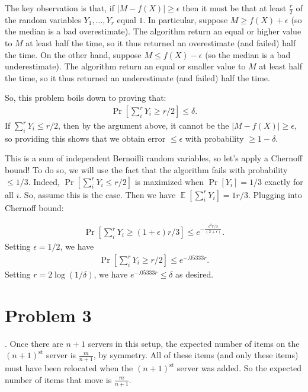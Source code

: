 \documentclass[11pt]{article}
\DeclareMathOperator*{\E}{\mathbb{E}}
\begin{document}
The key observation is that, if $|M - f(X)| \geq \epsilon$ then it must be that at least $\frac{r}{2}$ of the random variables $Y_1, \ldots, Y_r$ equal $1$. In particular, suppose $M \geq f(X) + \epsilon$ (so the median is a bad overestimate). The algorithm return an equal or higher value to $M$ at least  half the time, so it thus returned an overestimate (and failed) half the time. On the other hand, suppose  $M \leq f(X) - \epsilon$ (so the median is a bad underestimate). The algorithm return an equal or smaller value to $M$ at least half the time, so it thus returned an underestimate (and failed) half the time. 

So, this problem boils down to proving that: 
\begin{align*}
\Pr\left[\sum_i^r Y_i \geq r/2\right] \leq \delta.
\end{align*}
If $\sum_i^r Y_i \leq r/2$, then by the argument above, it cannot be the $|M - f(X)| \geq \epsilon$, so providing this shows that we obtain error $\leq \epsilon$ with probability $\geq 1-\delta$. 

This is a sum of independent Bernoilli random variables, so let's apply a Chernoff bound! To do so, we will use the fact that the algorithm fails with probability $\leq 1/3$. Indeed, $\Pr\left[\sum_i^r Y_i \leq r/2\right]$ is maximized when $\Pr[Y_i] = 1/3$ exactly for all $i$. So, assume this is the case. Then we have $\E[\sum_i^r Y_i] = 1r/3$. Plugging into Chernoff bound:

\begin{align*}
\Pr\left[\sum_i^r Y_i \geq (1+\epsilon) r/3\right] \leq e^{-\frac{\epsilon^2 r/3}{(2+\epsilon)}}.
\end{align*}
Setting $\epsilon = 1/2$, we have
\begin{align*}
	\Pr\left[\sum_i^r Y_i \geq r/2\right] \leq e^{-.05333 r}. 
\end{align*}
Setting $r = 2\log(1/\delta)$, we have $e^{-.05333 r} \leq \delta$ as desired.


\section*{Problem 3}
	\smallskip{}.\hspace{1em} 
	Once there are $n+1$ servers in this setup, the expected number of items on the $(n+1)^\text{st}$ server is $\frac{m}{n+1}$, by symmetry. All of these items (and only these items) must have been relocated when the $(n+1)^{\text{st}}$ server was added. So the expected number of items that move is $\frac{m}{n+1}$. 
	
\end{document}
